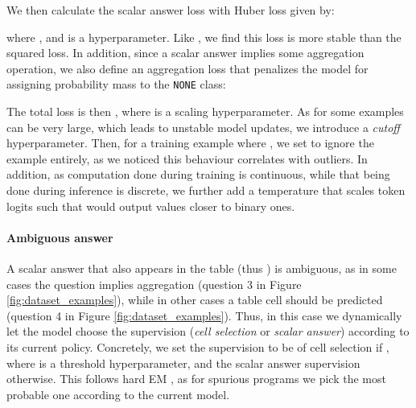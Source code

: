 \documentclass[11pt,a4paper]{article}
\begin{document}
\begin{table}[t]
\begin{center}
\end{center}
\caption{Aggregation operators soft implementation. \texttt{AVERAGE} approximation is discussed in Appendix \ref{sec:stochastic_average}. Note that probabilities  outside of the column selected by the model are set to 0.}
\label{tab:operators}
\end{table}

We then calculate the scalar answer loss with Huber loss \cite{huber1964robust} given by:

where , and  is a hyperparameter. Like , we find this loss is more stable than the squared loss. In addition, since a scalar answer implies some aggregation operation, we also define an aggregation loss that penalizes the model for assigning probability mass to the \texttt{NONE} class: 

The total loss is then ,
where  is a scaling hyperparameter. As for some examples  can be very large, which leads to unstable model updates, we introduce a \textit{cutoff} hyperparameter. Then, for a training example where , we set  to ignore the example entirely, as we noticed this behaviour correlates with outliers. 
In addition, as computation done during training is continuous, while that being done during inference is discrete, we further add a temperature that scales token logits such that  would output values closer to binary ones.

\paragraph{Ambiguous answer} A scalar answer  that also appears in the table (thus ) is ambiguous, as in some cases the question implies aggregation (question 3 in Figure \ref{fig:dataset_examples}), while in other cases a table cell should be predicted (question 4 in Figure \ref{fig:dataset_examples}). Thus, in this case we dynamically let the model choose the supervision (\textit{cell selection} or \textit{scalar answer}) according to its current policy. Concretely, we set the supervision to be of cell selection if , where  is a threshold hyperparameter, and the scalar answer supervision otherwise. This follows hard EM \cite{min2019discrete}, as for spurious programs we pick the most probable one according to the current model.
\end{document}
